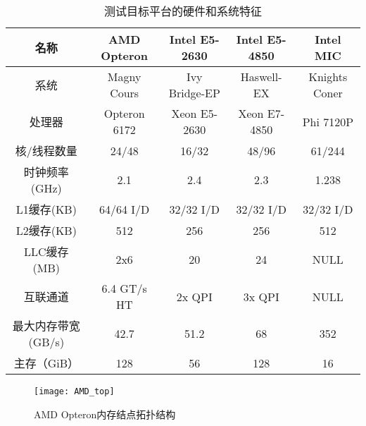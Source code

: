 \begin{table}[htbp]
  \centering
  \caption{测试目标平台的硬件和系统特征}
  \label{tab:arch_info}
  \begin{tabular}{ccccc}
    \toprule
       名称             & AMD Opteron           & Intel E5-2630       & Intel E5-4850     & Intel MIC \\
    \midrule
      系统               & Magny Cours      &  Ivy Bridge-EP        &  Haswell-EX         &  Knights Coner \\
      处理器             &  Opteron 6172         &  Xeon E5-2630      & Xeon E7-4850     &  Phi 7120P \\
      核/线程数量         & 24/48                & 16/32                & 48/96              & 61/244 \\
      时钟频率(GHz)       & 2.1                  & 2.4                  & 2.3               & 1.238 \\
      L1缓存(KB)         & 64/64 I/D             & 32/32 I/D            & 32/32 I/D         & 32/32 I/D \\
      L2缓存(KB)         & 512                  & 256                   & 256               & 512 \\
      LLC缓存(MB)        & 2x6                  & 20                    & 24                & NULL \\
      互联通道            & 6.4 GT/s HT          & 2x QPI               & 3x QPI             & NULL \\
      最大内存带宽(GB/s)   & 42.7                 & 51.2                 & 68                & 352   \\
      主存（GiB）         & 128                   & 56                  & 128                & 16 \\
    \bottomrule
  \end{tabular}
\end{table}

\begin{figure}[htbp]
\centering
\texttt{[image: AMD\_top]}
\caption{AMD Opteron内存结点拓扑结构}\label{fig:AMD_top}
\end{figure}

